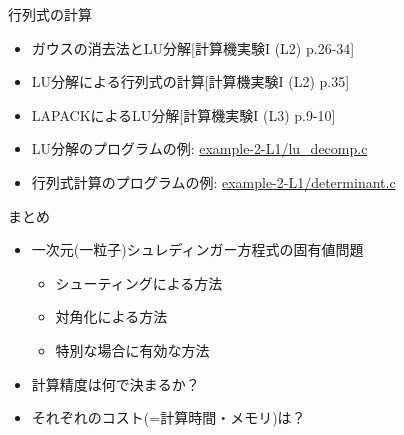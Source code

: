 \documentclass[dvipdfmx]{beamer}
\begin{document}


\begin{frame}[t,fragile]{行列式の計算}
  \begin{itemize}
    \setlength{\itemsep}{1em}
  \item ガウスの消去法とLU分解[計算機実験I (L2) p.26-34]
  \item LU分解による行列式の計算[計算機実験I (L2) p.35]
  \item LAPACKによるLU分解[計算機実験I (L3) p.9-10]
  \item LU分解のプログラムの例: \href{https://github.com/todo-group/computer-experiments/blob/master/exercise/linear_system/lu_decomp.c}{example-2-L1/lu\_decomp.c}
  \item 行列式計算のプログラムの例: \href{https://github.com/todo-group/computer-experiments/blob/master/exercise/linear_system/determinant.c}{example-2-L1/determinant.c}
  \end{itemize}
\end{frame}

\begin{frame}[t,fragile]{まとめ}
  \begin{itemize}
    \setlength{\itemsep}{1em}
  \item 一次元(一粒子)シュレディンガー方程式の固有値問題
    \begin{itemize}
    \item シューティングによる方法
    \item 対角化による方法
    \item 特別な場合に有効な方法
    \end{itemize}
  \item 計算精度は何で決まるか？
  \item それぞれのコスト(=計算時間・メモリ)は？
  \end{itemize}
\end{frame}
\end{document}
